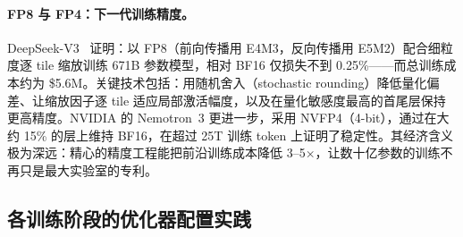 \paragraph{FP8 与 FP4：下一代训练精度。}
DeepSeek-V3~\cite{deepseekv3} 证明：以 FP8（前向传播用 E4M3，反向传播用 E5M2）配合细粒度逐 tile 缩放训练 671B 参数模型，相对 BF16 仅损失不到 0.25\%——而总训练成本约为 \$5.6M。关键技术包括：用随机舍入（stochastic rounding）降低量化偏差、让缩放因子逐 tile 适应局部激活幅度，以及在量化敏感度最高的首尾层保持更高精度。NVIDIA 的 Nemotron~3 更进一步，采用 NVFP4（4-bit），通过在大约 15\% 的层上维持 BF16，在超过 25T 训练 token 上证明了稳定性。其经济含义极为深远：精心的精度工程能把前沿训练成本降低 3--5$\times$，让数十亿参数的训练不再只是最大实验室的专利。

\subsection{各训练阶段的优化器配置实践}
\label{practical-optimizer-settings-by-training-phase}

